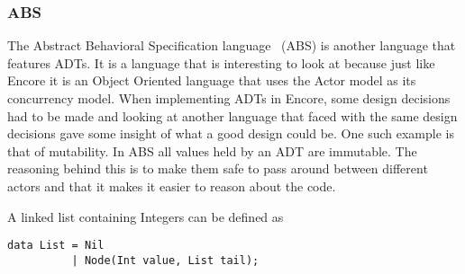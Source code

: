 \documentclass[10pt]{report}
\begin{document}
\subsubsection{ABS}%
\par{The Abstract Behavioral Specification language~\cite{10.1007/978-3-642-25271-6_8} (ABS) is another language that features ADTs. It is a language that is interesting to look at because just like Encore it is an Object Oriented language that uses the Actor model as its concurrency model. When implementing ADTs in Encore, some design decisions had to be made and looking at another language that faced with the same design decisions gave some insight of what a good design could be. One such example is that of mutability. In ABS all values held by an ADT are immutable. The reasoning behind this is to make them safe to pass around between different actors and that it makes it easier to reason about the code.}%
\par{A linked list containing Integers can be defined as}
\begin{lstlisting}[language=encore,caption={Linked list in ABS}]
data List = Nil
          | Node(Int value, List tail);
\end{lstlisting}
\end{document}
